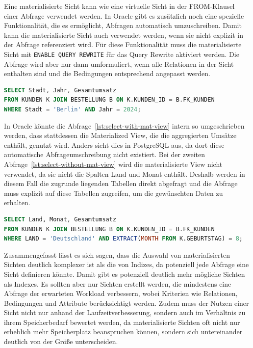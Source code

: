 Eine materialisierte Sicht kann wie eine virtuelle Sicht in der FROM-Klausel einer Abfrage verwendet werden.
In Oracle gibt es zusätzlich noch eine spezielle Funktionalität, die es ermöglicht, Abfragen automatisch umzuschreiben.
Damit kann die materialisierte Sicht auch verwendet werden, wenn sie nicht explizit in der Abfrage referenziert wird.
Für diese Funktionalität muss die materialisierte Sicht mit \texttt{ENABLE QUERY REWRITE} für das Query Rewrite aktiviert werden.
Die Abfrage wird aber nur dann umformuliert, wenn alle Relationen in der Sicht enthalten sind und die Bedingungen entsprechend angepasst werden.

\vspace{-5pt}
\begin{lstlisting}[language=SQL,caption=Select mit View,label={lst:select-with-mat-view}]
SELECT Stadt, Jahr, Gesamtumsatz
FROM KUNDEN K JOIN BESTELLUNG B ON K.KUNDEN_ID = B.FK_KUNDEN
WHERE Stadt = 'Berlin' AND Jahr = 2024;
\end{lstlisting}
\vspace{-5pt}

In Oracle könnte die Abfrage~\ref{lst:select-with-mat-view} intern so umgeschrieben werden, dass stattdessen die Materialized View, die die aggregierten Umsätze enthält, genutzt wird.
Anders sieht dies in PostgreSQL aus, da dort diese automatische Abfrageumschreibung nicht existiert.
Bei der zweiten Abfrage~\ref{lst:select-without-mat-view} wird die materialisierte View nicht verwendet, da sie nicht die Spalten Land und Monat enthält.
Deshalb werden in diesem Fall die zugrunde liegenden Tabellen direkt abgefragt und die Abfrage muss explizit auf diese Tabellen zugreifen, um die gewünschten Daten zu erhalten.

\vspace{-5pt}
\begin{lstlisting}[language=SQL,caption=Select nicht für View,label={lst:select-without-mat-view}]
SELECT Land, Monat, Gesamtumsatz
FROM KUNDEN K JOIN BESTELLUNG B ON K.KUNDEN_ID = B.FK_KUNDEN
WHERE LAND = 'Deutschland' AND EXTRACT(MONTH FROM K.GEBURTSTAG) = 8;
\end{lstlisting}
\vspace{-5pt}


Zusammengefasst lässt es sich sagen, dass die Auswahl von materialisierten Sichten deutlich komplexer ist als die von Indizes, da potenziell jede Abfrage eine Sicht definieren könnte.
Damit gibt es potenziell deutlich mehr mögliche Sichten als Indexes.
Es sollten aber nur Sichten erstellt werden, die mindestens eine Abfrage der erwarteten Workload verbessern, wobei Kriterien wie Relationen, Bedingungen und Attribute berücksichtigt werden.
Zudem muss der Nutzen einer Sicht nicht nur anhand der Laufzeitverbesserung, sondern auch im Verhältnis zu ihrem Speicherbedarf bewertet werden, da materialisierte Sichten oft nicht nur erheblich mehr Speicherplatz beanspruchen können, sondern sich untereinander deutlich von der Größe unterscheiden.

